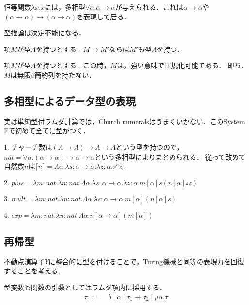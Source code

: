 \documentclass[uplatex, 12pt, dvipdfmx]{jsreport}
\begin{document}
\begin{example}
    恒等関数$\lambda x.x$には，多相型$\forall\alpha.\alpha\to\alpha$が与えられる．これは$\alpha\to\alpha$や$(\alpha\to\alpha)\to(\alpha\to\alpha)$を表現して居る．
\end{example}

\begin{proposition}[型推論]
    型推論は決定不能になる．
\end{proposition}

\begin{theorem}
    項$M$が型$A$を持つとする．$M\to M'$ならば$M'$も型$A$を持つ．
\end{theorem}
\begin{theorem}
    項$M$が型$A$を持つとする．この時，$M$は，強い意味で正規化可能である．
    即ち．$M$は無限$\beta$簡約列を持たない．
\end{theorem}

\subsection{多相型によるデータ型の表現}
実は単純型付ラムダ計算では，Church numeralsはうまくいかない．このSystem Fで初めて全てに型がつく．

\begin{example}
    1. チャーチ数は$(A\to A)\to A\to A$という型を持つので，$nat = \forall\alpha.(\alpha\to\alpha)\to\alpha\to\alpha$という多相型によりまとめられる．
    従って改めて自然数$n$は$\lceil n\rceil = \Lambda\alpha.\lambda s:\alpha\to\alpha.\lambda z:\alpha.s^nz$．

    2. $plus = \lambda m:nat.\lambda n:nat.\Lambda\alpha.\lambda s:\alpha\to\alpha.\lambda z:\alpha.m[\alpha]s(n[\alpha]sz)$

    3. $mult = \lambda m:nat.\lambda n:nat.\Lambda\alpha.\lambda s:\alpha\to\alpha.m[\alpha](n[\alpha]s)$

    4. $exp = \lambda m:nat.\lambda n:nat.\Lambda\alpha.n[\alpha\to\alpha](m[\alpha])$
\end{example}

\subsection{再帰型}
不動点演算子$Y$に整合的に型を付けることで，Turing機械と同等の表現力を回復することを考える．

\begin{shadebox}\begin{definition}[再帰型]
    型変数も関数の引数としてはラムダ項内に採用する．
    \begin{align*}
        \tau ::=&\; b\mid \alpha\mid \tau_1\to\tau_2 \mid \mu\alpha.\tau
    \end{align*}
\end{definition}\end{shadebox}
\end{document}
